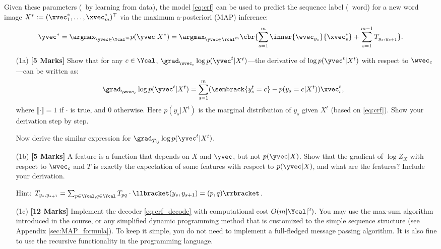 \documentclass[11pt]{report}
\begin{document}
Given these parameters (\eg\ by learning from data), the model \eqref{eq:crf} can be used to predict the sequence label (\ie\ word) for a new word image $X^* := (\xvec^*_1, \ldots, \xvec^*_m)^\top$ via the maximum a-posteriori (MAP) inference:
\begin{align}
	\label{eq:crf_decode}
	\yvec^* = \argmax_{\yvec \in \Ycal^m} p(\yvec | X^*)
	= \argmax_{\yvec \in \Ycal^m} \cbr{ \sum_{s=1}^m \inner{\wvec_{y_s}}{\xvec^*_s} + \sum_{s=1}^{m-1} T_{y_s, y_{s+1}}}.
\end{align}




\begin{itemize}
	\item[(1a)] {\bf [5 Marks]} Show that for any $c \in \Ycal$, 
	$\grad_{\wvec_c} \log p(\yvec^t|X^t)$---the derivative of $\log p(\yvec^t|X^t)$ with respect to $\wvec_c$---can be written as:
	\begin{align}
		\grad_{\wvec_c} \log p(\yvec^t|X^t) & = \sum_{s=1}^m (\sembrack{y^t_s = c} - p(y_s = c | X^t)) \xvec^t_s,
	\end{align}
	where $\llbracket \cdot \rrbracket = 1$ if $\cdot$ is true, and 0 otherwise.
	Here $p(y_s | X^t)$ is the marginal distribution of $y_s$ given $X^t$ (based on \eqref{eq:crf}).
	Show your derivation step by step.
	
	Now derive the similar expression for $\grad_{T_{ij}} \log p(\yvec^t|X^t)$.
	
	\item[(1b)] {\bf [5 Marks]} A feature is a function that depends on $X$ and $\yvec$, but not $p(\yvec|X)$. Show that the gradient of $\log Z_X$ with respect to $\wvec_c$ and $T$ is exactly the expectation of some features with respect to $p(\yvec | X)$, and what are the features? Include your derivation.
	
	Hint: $T_{y_s, y_{s+1}} = \sum_{p \in \Ycal, q \in \Ycal} T_{pq} \cdot \llbracket (y_s, y_{s+1}) = (p,q)  \rrbracket$.
	
	\item[(1c)] {\bf [12 Marks]} Implement the decoder \eqref{eq:crf_decode} with computational cost $O(m|\Ycal|^2)$.
	You may use the max-sum algorithm introduced in the course, or any simplified dynamic programming method that is customized to the simple sequence structure (see Appendix \ref{sec:MAP_formula}). 
	To keep it simple, you do not need to implement a full-fledged message passing algorithm.
	It is also fine to use the recursive functionality in the programming language.
	

\end{itemize}
\end{document}
